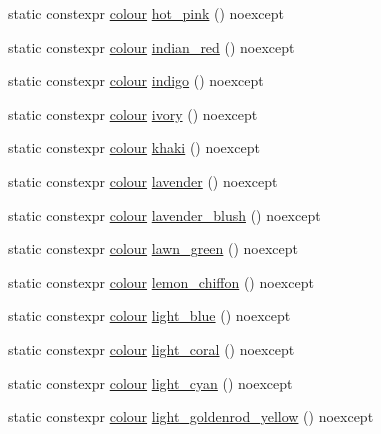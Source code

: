 \begin{DoxyCompactItemize}
\item 
static constexpr \mbox{\hyperlink{classmoka_1_1colour}{colour}} \mbox{\hyperlink{classmoka_1_1colour_a903c5603cd83d439a79d27aa7baec33b}{hot\+\_\+pink}} () noexcept
\item 
static constexpr \mbox{\hyperlink{classmoka_1_1colour}{colour}} \mbox{\hyperlink{classmoka_1_1colour_a808f0790d09569dfa2536ebc91a189c1}{indian\+\_\+red}} () noexcept
\item 
static constexpr \mbox{\hyperlink{classmoka_1_1colour}{colour}} \mbox{\hyperlink{classmoka_1_1colour_a1654854532d2dd5af3143edaaf95a5ca}{indigo}} () noexcept
\item 
static constexpr \mbox{\hyperlink{classmoka_1_1colour}{colour}} \mbox{\hyperlink{classmoka_1_1colour_a89c362959da67bdb0900b26966611ecf}{ivory}} () noexcept
\item 
static constexpr \mbox{\hyperlink{classmoka_1_1colour}{colour}} \mbox{\hyperlink{classmoka_1_1colour_a1e92a40a2b17059f3687fdb4ad28a903}{khaki}} () noexcept
\item 
static constexpr \mbox{\hyperlink{classmoka_1_1colour}{colour}} \mbox{\hyperlink{classmoka_1_1colour_a46763102fc27ba8ead1c3b51462d0722}{lavender}} () noexcept
\item 
static constexpr \mbox{\hyperlink{classmoka_1_1colour}{colour}} \mbox{\hyperlink{classmoka_1_1colour_aa49ab82953f6b5120105bab3c5a7cbb3}{lavender\+\_\+blush}} () noexcept
\item 
static constexpr \mbox{\hyperlink{classmoka_1_1colour}{colour}} \mbox{\hyperlink{classmoka_1_1colour_aa78d9ebdf53e2a9544c000b41049383b}{lawn\+\_\+green}} () noexcept
\item 
static constexpr \mbox{\hyperlink{classmoka_1_1colour}{colour}} \mbox{\hyperlink{classmoka_1_1colour_a8089dc3cdbf507cad1267670e9a6908a}{lemon\+\_\+chiffon}} () noexcept
\item 
static constexpr \mbox{\hyperlink{classmoka_1_1colour}{colour}} \mbox{\hyperlink{classmoka_1_1colour_a93f0616ef85c6092d04ce72c65002fe6}{light\+\_\+blue}} () noexcept
\item 
static constexpr \mbox{\hyperlink{classmoka_1_1colour}{colour}} \mbox{\hyperlink{classmoka_1_1colour_ab63863d1a2c98380a5e053005d5ef49b}{light\+\_\+coral}} () noexcept
\item 
static constexpr \mbox{\hyperlink{classmoka_1_1colour}{colour}} \mbox{\hyperlink{classmoka_1_1colour_a12b432469d965a7925083d7764599f3e}{light\+\_\+cyan}} () noexcept
\item 
static constexpr \mbox{\hyperlink{classmoka_1_1colour}{colour}} \mbox{\hyperlink{classmoka_1_1colour_aebe01473b0f4a8a01367e12379f97f8e}{light\+\_\+goldenrod\+\_\+yellow}} () noexcept

\end{DoxyCompactItemize}

